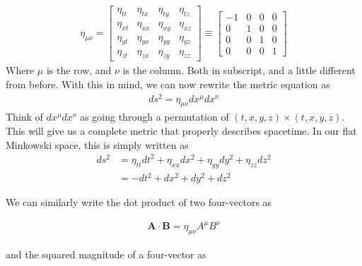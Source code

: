 \documentclass[11pt,letterpaper]{book}
\begin{document}
\begin{align}
\eta_{\mu\nu}=
\begin{bmatrix}
    \eta_{tt} & \eta_{tx} & \eta_{ty} & \eta_{tz} \\
    \eta_{xt} & \eta_{xx} & \eta_{xy} & \eta_{xz} \\
    \eta_{yt} & \eta_{yx} & \eta_{yy} & \eta_{yz} \\
    \eta_{zt} & \eta_{zx} & \eta_{zy} & \eta_{zz}
\end{bmatrix}
\equiv
\begin{bmatrix}
    -1 & 0 & 0 & 0 \\
     0 & 1 & 0 & 0 \\
     0 & 0 & 1 & 0 \\
     0 & 0 & 0 & 1
\end{bmatrix}
\end{align}
Where $\mu$ is the row, and $\nu$ is the column. Both in subscript, and a little different from before. With this in mind, we can now rewrite the metric equation as
\begin{align}
ds^2 = \eta_{\mu\nu}dx^{\mu}dx^{\nu}
\end{align}
Think of $dx^{\mu}dx^{\nu}$ as going through a permutation of $(t,x,y,z)\times(t,x,y,z)$. This will give us a complete metric that properly describes spacetime. In our flat Minkowski space, this is simply written as
\begin{align}
ds^2 &= \eta_{tt} dt^2 + \eta_{xx} dx^2 + \eta_{yy} dy^2 + \eta_{zz} dz^2 \nonumber \\
     &= -dt^2 + dx^2 + dy^2 + dz^2
\end{align}

We can similarly write the dot product of two four-vectors as

\begin{align}
\mathbf{A} \cdot \mathbf{B} = \eta_{\mu \nu} A^\mu B^\nu
\end{align}

and the squared magnitude of a four-vector as
\end{document}
